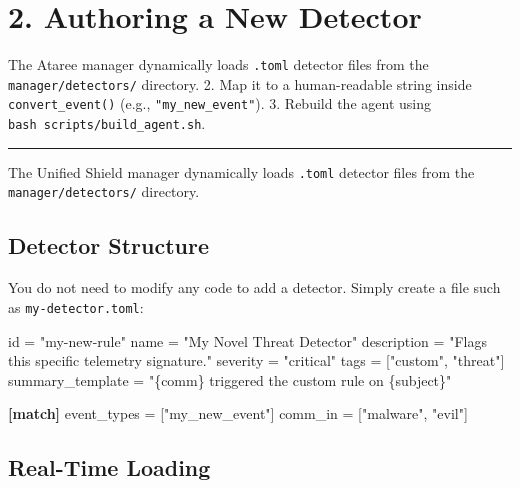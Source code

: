 \documentclass[
  12pt,
]{report}
\newenvironment{Shaded}{}{}
\newcommand{\DataTypeTok}[1]{\textcolor[rgb]{0.56,0.13,0.00}{#1}}
\newcommand{\KeywordTok}[1]{\textcolor[rgb]{0.00,0.44,0.13}{\textbf{#1}}}
\newcommand{\OperatorTok}[1]{\textcolor[rgb]{0.40,0.40,0.40}{#1}}
\newcommand{\StringTok}[1]{\textcolor[rgb]{0.25,0.44,0.63}{#1}}
\begin{document}
\section{2. Authoring a New Detector}\label{authoring-a-new-detector}

The Ataree manager dynamically loads \texttt{.toml} detector files from
the \texttt{manager/detectors/} directory. 2. Map it to a human-readable
string inside \texttt{convert\_event()} (e.g.,
\texttt{"my\_new\_event"}). 3. Rebuild the agent using
\texttt{bash\ scripts/build\_agent.sh}.

\begin{center}\rule{0.5\linewidth}{0.5pt}\end{center}

The Unified Shield manager dynamically loads \texttt{.toml} detector
files from the \texttt{manager/detectors/} directory.

\subsection{Detector Structure}\label{detector-structure}

You do not need to modify any code to add a detector. Simply create a
file such as \texttt{my-detector.toml}:

\begin{Shaded}
\begin{Highlighting}[]
\DataTypeTok{id} \OperatorTok{=} \StringTok{"my{-}new{-}rule"}
\DataTypeTok{name} \OperatorTok{=} \StringTok{"My Novel Threat Detector"}
\DataTypeTok{description} \OperatorTok{=} \StringTok{"Flags this specific telemetry signature."}
\DataTypeTok{severity} \OperatorTok{=} \StringTok{"critical"}
\DataTypeTok{tags} \OperatorTok{=} \OperatorTok{[}\StringTok{"custom"}\OperatorTok{,} \StringTok{"threat"}\OperatorTok{]}
\DataTypeTok{summary\_template} \OperatorTok{=} \StringTok{"\{comm\} triggered the custom rule on \{subject\}"}

\KeywordTok{[match]}
\DataTypeTok{event\_types} \OperatorTok{=} \OperatorTok{[}\StringTok{"my\_new\_event"}\OperatorTok{]}
\DataTypeTok{comm\_in} \OperatorTok{=} \OperatorTok{[}\StringTok{"malware"}\OperatorTok{,} \StringTok{"evil"}\OperatorTok{]}
\end{Highlighting}
\end{Shaded}

\subsection{Real-Time Loading}\label{real-time-loading}
\end{document}

